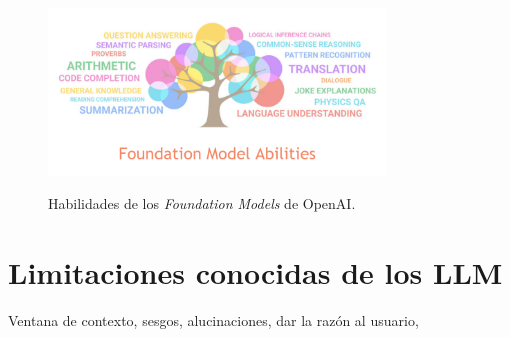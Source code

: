 \begin{figure}
    \caption{Habilidades de los \textit{Foundation Models} de OpenAI.}
    \centering
    \includegraphics[width=0.8\textwidth]{./figuras/fundation_models_habilities.png}
    \label{fig:fundation_models_habilities}
\end{figure}


\section{Limitaciones conocidas de los LLM}
\label{sec:limitaciones_llm}
Ventana de contexto, sesgos, alucinaciones, dar la razón al usuario, 










